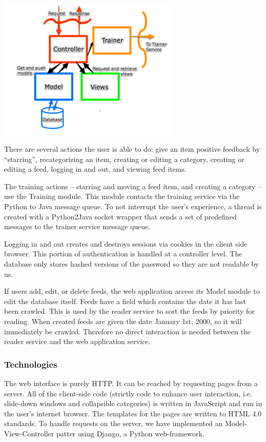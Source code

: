 \documentclass[letterpaper]{article}
\begin{document}
\noindent\includegraphics[width=3.4in]{MVC.png}

There are several actions the user is able to do: give an item positive feedback by ``starring'', recategorizing an item, creating or editing a category, creating or editing a feed, logging in and out, and viewing feed items.

The training actions -- starring and moving a feed item, and creating a category -- use the Training module. This module contacts the training service via the Python to Java message queue. To not interrupt the user's experience, a thread is created with a Python2Java socket wrapper that sends a set of predefined messages to the trainer service message queue.

Logging in and out creates and destroys sessions via cookies in the client side browser. This portion of authentication is handled at a controller level. The database only stores hashed versions of the password so they are not readable by us.

If users add, edit, or delete feeds, the web application access its Model module to edit the database itself.  Feeds have a field which contains the date it has last been crawled.  This is used by the reader service to sort the feeds by priority for reading.  When created feeds are given the date January 1st, 2000, so it will immediately be crawled.  Therefore no direct interaction is needed between the reader service and the web application service.

\subsubsection{Technologies}
The web interface is purely HTTP.  It can be reached by requesting pages from a server.  All of the client-side code (strictly code to enhance user interaction, i.e. slide-down windows and collapsible categories) is written in JavaScript and run in the user's internet browser. The templates for the pages are written to HTML 4.0 standards. To handle requests on the server, we have implemented an Model-View-Controller patter using Django, a Python web-framework.  
\end{document}
